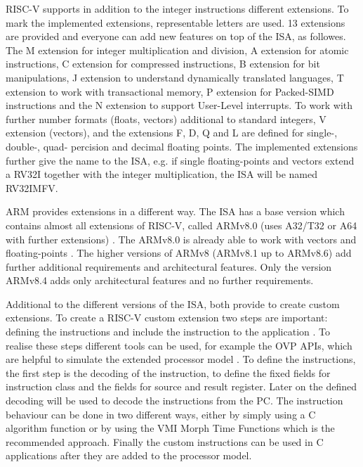 \documentclass[conference]{IEEEtran}
\begin{document}
	RISC-V supports in addition to the integer instructions different extensions. To mark the implemented extensions, representable letters are used. 13 extensions are provided and everyone can add new features on top of the \gls{ISA}, as followes. The M extension for integer multiplication and division, A extension for atomic instructions, C extension for compressed instructions, B extension for bit manipulations, J extension to understand dynamically translated languages, T extension to work with transactional memory, P extension for Packed-SIMD instructions and the N extension to support User-Level interrupts. To work with further number formats (floats, vectors) additional to standard integers, V extension (vectors), and the extensions F, D, Q and L are defined for single-, double-, quad- percision and decimal floating points. The implemented extensions further give the name to the \gls{ISA}, e.g. if single floating-points and vectors extend a RV32I together with the integer multiplication, the \gls{ISA} will be named RV32IMFV. \cite[page 31-52, 71-103]{Waterman2017}
	
	ARM provides extensions in a different way. The \gls{ISA} has a base version which contains almost all extensions of RISC-V, called ARMv8.0 (uses A32/T32 or A64 with further extensions) \cite[page 60]{Arm2020}. The ARMv8.0 is already able to work with vectors and floating-points \cite[page 40- 50]{Arm2020}. The higher versions of ARMv8 (ARMv8.1 up to ARMv8.6) add further additional requirements and architectural features. Only the version ARMv8.4 adds only architectural features and no further requirements. \cite[page 60ff]{Arm2020}
	
	Additional to the different versions of the \gls{ISA}, both provide to create custom extensions.
	To create a RISC-V custom extension two steps are important: defining the instructions and include the instruction to the application \cite[page 16 - 21]{Limited2019}. To realise these steps different tools can be used, for example the OVP APIs, which are helpful to simulate the extended processor model \cite{Imperas}.
	To define the instructions, the first step is the decoding of the instruction, to define the fixed fields for instruction class and the fields for source and result register. Later on the defined decoding will be used to decode the instructions from the PC. The instruction behaviour can be done in two different ways, either by simply using a C algorithm function or by using the VMI Morph Time Functions which is the recommended approach. Finally the custom instructions can be used in C applications after they are added to the processor model. \cite[page 16 - 21]{Limited2019}
	
\end{document}
